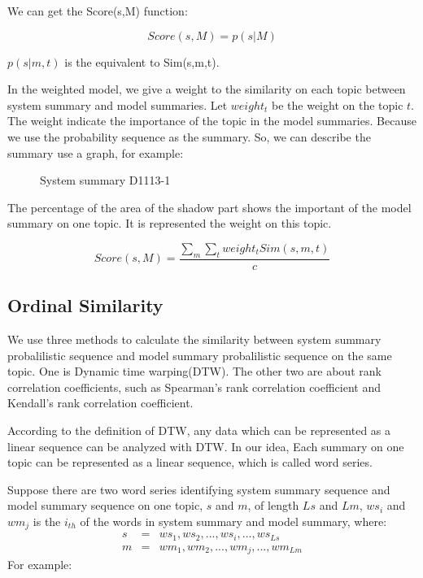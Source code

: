 We can get the Score(s,M) function:

\begin{equation*}
Score(s,M) = p(s|M) 
\end{equation*}

$p(s|m,t)$ is the equivalent to Sim(s,m,t).

In the weighted model, we give a weight to the similarity on each topic
between system summary and model summaries. Let $weight_{t}$ be the weight 
on the topic $t$. The weight indicate the importance of the topic in the 
model summaries. Because we use the probability sequence as the summary.
So, we can describe the summary use a graph, for example: 

\begin{figure}[th]
\center
{}
\caption{System summary D1113-1}
\label{fig:digit}
\end{figure}

The percentage of the area of the shadow part shows the important of the model summary
on one topic. It is represented the weight on this topic.

\begin{equation*}
Score(s,M) = \frac{\sum_m\sum_t weight_{t} Sim(s,m,t)}{c}
\end{equation*}


\subsection{Ordinal Similarity}

We use three methods to calculate the similarity between system summary 
probalilistic sequence and model summary probalilistic sequence on the same topic. 
One is Dynamic time warping(DTW). The other two are about rank correlation 
coefficients, such as Spearman's rank correlation coefficient and Kendall's 
rank correlation coefficient.

According to the definition of DTW, any data which can be represented as 
a linear sequence  can be analyzed with DTW. In our idea, Each summary 
on one topic can be represented as a linear sequence, 
which is called word series.

Suppose there are two word series identifying system summary sequence and 
model summary sequence on one topic, $s$ and $m$, of length $Ls$ and $Lm$,
$ws_{i}$ and $wm_{j}$ is the $i_{th}$ of the words in system summary and model summary,
where:
\begin{eqnarray*}
s &=& ws_{1},ws_{2},...,ws_{i},...,ws_{Ls}\\ 
m &=& wm_{1},wm_{2},...,wm_{j},...,wm_{Lm} 
\end{eqnarray*}
For example:

